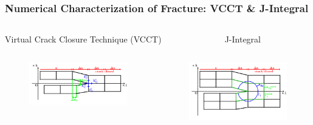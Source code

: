 \documentclass[first,firstsupp,lastsupp,last,hyperref,table]{ETHclass}
\begin{document}
\begin{frame}
\frametitle{\vspace{0.3cm} \scriptsize Numerical Characterization of Fracture: VCCT \& J-Integral}
\vspace{-0.75cm}
\centering
\scriptsize
\begin{columns}[t]
\begin{column}{0.5\textwidth}
\centering
Virtual Crack Closure Technique (VCCT)
\end{column}
\begin{column}{0.5\textwidth}
\centering
J-Integral
\end{column}
\end{columns}
\vspace{-0.25cm}
\begin{columns}[c]
\begin{column}{0.5\textwidth}
\centering
\begin{figure}
\includegraphics[width=\columnwidth]{VCCT.pdf}
  \label{fig:vcct}
\end{figure}
\end{column}
\begin{column}{0.5\textwidth}
\begin{figure}
\includegraphics[width=\columnwidth]{J-integral.pdf}

\end{figure}
\end{column}
\end{columns}
\end{frame}
\end{document}
